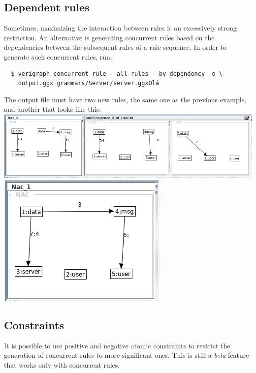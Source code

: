 \documentclass[12pt]{article}
\begin{document}
\subsection{Dependent rules}

Sometimes, maximizing the interaction between rules is an excessively strong restriction. An alternative is generating concurrent rules based on the dependencies between the subsequent rules of a rule sequence. In order to generate such concurrent rules, run:

\begin{verbatim}
  $ verigraph concurrent-rule --all-rules --by-dependency -o \ 
  	output.ggx grammars/Server/server.ggxOlá 
\end{verbatim}

The output file must have two new rules, the same one as the previous example, and another that looks like this:\\

\noindent
\includegraphics[scale = 0.4]{rule-sequence_05a.png}\\
\noindent
\includegraphics[scale = 0.4]{rule-sequence_05b.png}\\

\pagebreak

\subsection{Constraints}

It is possible to use positive and negative atomic constraints to restrict the generation of concurrent rules to more significant ones. This is still a \textit{beta} feature that works only with concurrent rules.\\
\end{document}

